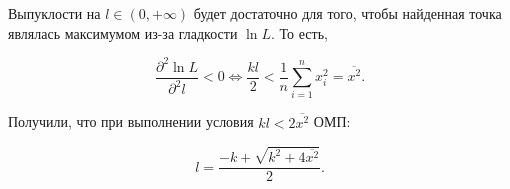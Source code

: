 \documentclass[14pt]{extarticle}
\begin{document}
Выпуклости на $l\in(0, +\infty)$ будет достаточно для того, чтобы найденная точка являлась максимумом из-за гладкости $\ln L$. То есть,

\begin{equation*}
    \frac{\partial^2 \ln L}{\partial^2 l} < 0 \Leftrightarrow \frac{kl}{2} < \frac{1}{n}\sum\limits_{i=1}^n x_i^2 = \overline{x^2}.
\end{equation*}

Получили, что при выполнении условия $kl < 2\overline{x^2}$ ОМП:

\begin{equation*}
    l = \frac{-k + \sqrt{k^2 + 4\overline{x^2}}}{2}.
\end{equation*}
\end{document}

